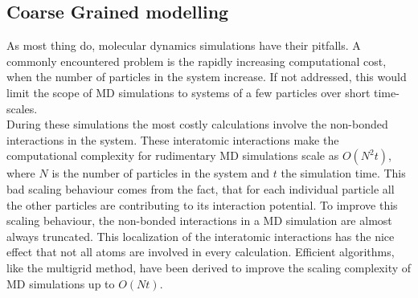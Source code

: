 %

\subsection{Coarse Grained modelling}
As most thing do, molecular dynamics simulations have their pitfalls. A commonly
encountered problem is the rapidly increasing computational cost, when the number of
particles in the system increase. If not addressed, this would limit the scope of MD
simulations to systems of a few particles over short time-scales.\\

During these simulations the most costly calculations involve the non-bonded
interactions in the system. These interatomic interactions make the computational
complexity for rudimentary MD simulations scale as $O(N^2t)$, where $N$ is the number of
particles in the system and $t$ the simulation time. This bad scaling behaviour comes
from the fact, that for each individual particle all the other particles are contributing
to its interaction potential. To improve this scaling behaviour, the non-bonded
interactions in a MD simulation are almost always truncated. This localization of the
interatomic interactions has the nice effect that not all atoms are involved in every
calculation. Efficient algorithms, like the multigrid method, have been derived to
improve the scaling complexity of MD simulations up to $O(Nt)$.\\


